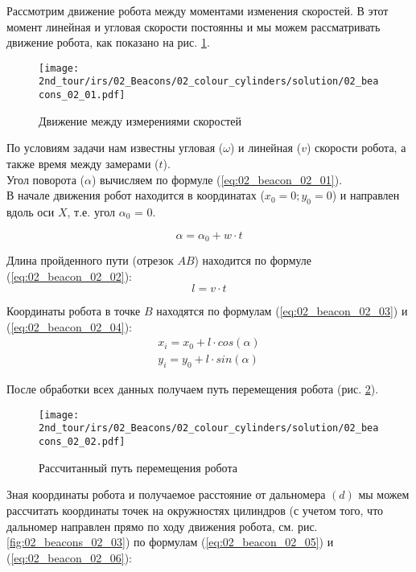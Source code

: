 \solutionSection

Рассмотрим движение робота между моментами изменения скоростей. В этот момент линейная и угловая скорости постоянны и мы можем рассматривать движение робота, как показано на рис. \ref{fig:02_beacons_02_01}.

\begin{figure}[H]
	\centering
	\texttt{[image: 2nd\_tour/irs/02\_Beacons/02\_colour\_cylinders/solution/02\_beacons\_02\_01.pdf]}
	\caption{Движение между измерениями скоростей}
	\label{fig:02_beacons_02_01}
\end{figure}

По условиям задачи нам известны угловая ($\omega$) и линейная ($v$) скорости робота, а также время между замерами ($t$).\\
Угол поворота ($\alpha$) вычисляем по формуле (\ref{eq:02_beacon_02_01}). \\
В начале движения робот находится в координатах ($x_0 = 0; y_0 = 0$) и направлен вдоль оси $X$, т.е. угол $\alpha_0$ = 0.

\begin{equation}
\alpha = \alpha_0 + w \cdot t
\label{eq:02_beacon_02_01}
\end{equation}

Длина пройденного пути (отрезок $AB$) находится по формуле (\ref{eq:02_beacon_02_02}):
\begin{equation}
l = v \cdot t
\label{eq:02_beacon_02_02}
\end{equation}

Координаты робота в точке $B$ находятся по формулам (\ref{eq:02_beacon_02_03}) и (\ref{eq:02_beacon_02_04}):
\begin{eqnarray}
x_i = x_0 + l \cdot cos(\alpha)
\label{eq:02_beacon_02_03}\\
y_i = y_0 + l \cdot sin(\alpha)
\label{eq:02_beacon_02_04}
\end{eqnarray}

После обработки всех данных получаем путь перемещения робота (рис. \ref{fig:02_beacons_02_02}).
\begin{figure}[H]
	\centering
	\texttt{[image: 2nd\_tour/irs/02\_Beacons/02\_colour\_cylinders/solution/02\_beacons\_02\_02.pdf]}
	\caption{Рассчитанный путь перемещения робота}
	\label{fig:02_beacons_02_02}
\end{figure}


Зная координаты робота и получаемое расстояние от дальномера $(d)$ мы можем рассчитать координаты точек на окружностях цилиндров (с учетом того, что дальномер направлен прямо по ходу движения робота, см. рис. \ref{fig:02_beacons_02_03}) по формулам (\ref{eq:02_beacon_02_05}) и (\ref{eq:02_beacon_02_06}):

